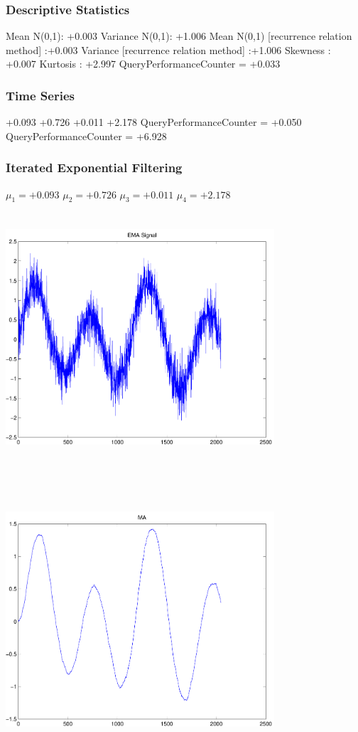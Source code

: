 \documentclass[9pt]{article}
\theoremstyle{plain}
\theoremstyle{definition}
\theoremstyle{remark}
\numberwithin{equation}{section}
\begin{document}
\subsubsection{Descriptive Statistics}
Mean N(0,1): +0.003
Variance N(0,1): +1.006
Mean N(0,1) [recurrence relation method] :+0.003
Variance [recurrence relation method] :+1.006
Skewness : +0.007
Kurtosis : +2.997
QueryPerformanceCounter  =  +0.033
\subsubsection{Time Series }
+0.093
+0.726
+0.011
+2.178
QueryPerformanceCounter  =  +0.050
QueryPerformanceCounter  =  +6.928
\subsubsection{Iterated Exponential Filtering }
$\mu_1 =+0.093$
$\mu_2 =+0.726$
$\mu_3 =+0.011$
$\mu_4 =+2.178$
\includegraphics[width=10.0cm,height=10.0cm]{EMA_signal.pdf}

\includegraphics[width=10.0cm,height=10.0cm]{MA.pdf}
\end{document}
